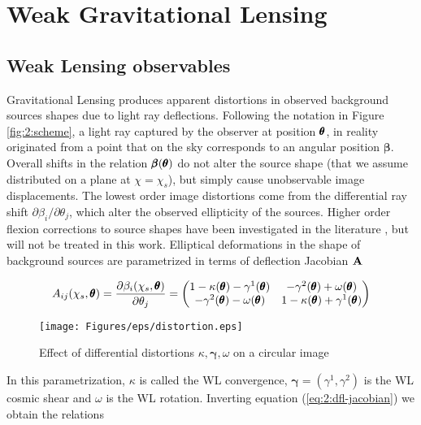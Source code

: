 \section{Weak Gravitational Lensing}

\subsection{Weak Lensing observables}
Gravitational Lensing produces apparent distortions in observed background sources shapes due to light ray deflections. Following the notation in Figure \ref{fig:2:scheme}, a light ray captured by the observer at position $\pmb{\theta}$, in reality originated from a point that on the sky corresponds to an angular position $\pmb{\beta}$. Overall shifts in the relation $\pmb{\beta}(\pmb{\theta})$ do not alter the source shape (that we assume distributed on a plane at $\chi=\chi_s$), but simply cause unobservable image displacements. The lowest order image distortions come from the differential ray shift $\partial \beta_i/\partial \theta_j$, which alter the observed ellipticity of the sources. Higher order flexion corrections to source shapes have been investigated in the literature \citep{BornFlexion}, but will not be treated in this work. Elliptical deformations in the shape of background sources are parametrized in terms of deflection Jacobian $\mathbf{A}$

\begin{equation}
\label{eq:2:dfl-jacobian}
A_{ij}(\chi_s,\pmb{\theta}) = \frac{\partial \beta_i(\chi_s,\pmb{\theta})}{\partial \theta_j} = 
\begin{pmatrix}
1-\kappa(\pmb{\theta})-\gamma^1(\pmb{\theta}) & -\gamma^2(\pmb{\theta})+\omega(\pmb{\theta}) \\
-\gamma^2(\pmb{\theta})-\omega(\pmb{\theta}) & 1-\kappa(\pmb{\theta})+\gamma^1(\pmb{\theta})
\end{pmatrix}
\end{equation}  
%
\begin{figure}
\begin{center}
\texttt{[image: Figures/eps/distortion.eps]}
\end{center}
\caption{Effect of differential distortions $\kappa,\pmb{\gamma},\omega$ on a circular image}
\label{fig:2:distortion}
\end{figure}
%
In this parametrization, $\kappa$ is called the WL convergence, $\pmb{\gamma}=(\gamma^1,\gamma^2)$ is the WL cosmic shear and $\omega$ is the WL rotation. Inverting equation (\ref{eq:2:dfl-jacobian}) we obtain the relations

